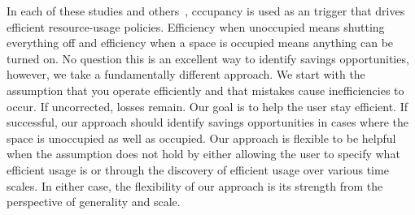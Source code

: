 In each of these studies and others~\cite{AgarwalBDGW11,buildanomaly}, cccupancy is used as an trigger
that drives efficient resource-usage policies.  Efficiency
when unoccupied means shutting everything off and efficiency when a space is occupied means anything
can be turned on.  No question this is an excellent way to identify savings opportunities, however, we
take a fundamentally different approach.  We start with the assumption that you operate efficiently and that mistakes
cause inefficiencies to occur.  If uncorrected, losses remain.  Our goal is to help the user stay efficient.
If successful, our approach should identify savings opportunities in cases where the space is unoccupied as well 
as occupied.   Our approach is flexible to be helpful when the assumption does not hold by either allowing the
user to specify what efficient usage is or through the discovery of efficient usage over various time scales.
In either case, the flexibility of our approach is its strength from the perspective of generality and scale.



